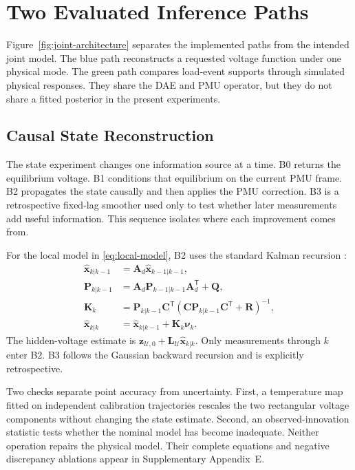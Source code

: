 \section{Two Evaluated Inference Paths}
\label{sec:estimation}

Figure~\ref{fig:joint-architecture} separates the implemented paths from the intended joint model. The blue path reconstructs a requested voltage function under one physical mode. The green path compares load-event supports through simulated physical responses. They share the DAE and PMU operator, but they do not share a fitted posterior in the present experiments.

\subsection{Causal State Reconstruction}

The state experiment changes one information source at a time. B0 returns the equilibrium voltage. B1 conditions that equilibrium on the current PMU frame. B2 propagates the state causally and then applies the PMU correction. B3 is a retrospective fixed-lag smoother used only to test whether later measurements add useful information. This sequence isolates where each improvement comes from.

For the local model in \eqref{eq:local-model}, B2 uses the standard Kalman recursion \cite{kalman1960}:
\begin{align}
 \widehat{\bm x}_{k|k-1}&=\bm A_d\widehat{\bm x}_{k-1|k-1},
 \nonumber\\[-1mm]
 \bm P_{k|k-1}&=\bm A_d\bm P_{k-1|k-1}\bm A_d^{\mathsf T}+\bm Q,
 \nonumber\\
 \bm K_k&=\bm P_{k|k-1}\bm C^{\mathsf T}
 (\bm C\bm P_{k|k-1}\bm C^{\mathsf T}+\bm R)^{-1},
 \nonumber\\
 \widehat{\bm x}_{k|k}&=\widehat{\bm x}_{k|k-1}
 +\bm K_k\bm\nu_k. \label{eq:kf-compact}
\end{align}
The hidden-voltage estimate is $\bm z_{\mathcal U,0}+\bm L_{\mathcal U}\widehat{\bm x}_{k|k}$. Only measurements through $k$ enter B2. B3 follows the Gaussian backward recursion \cite{rauch1965smoothing} and is explicitly retrospective.

Two checks separate point accuracy from uncertainty. First, a temperature map fitted on independent calibration trajectories rescales the two rectangular voltage components without changing the state estimate. Second, an observed-innovation statistic tests whether the nominal model has become inadequate. Neither operation repairs the physical model. Their complete equations and negative discrepancy ablations appear in Supplementary Appendix~E.

